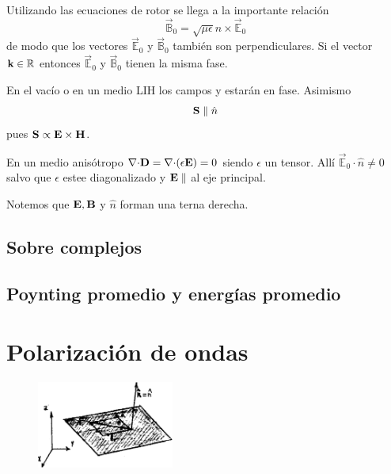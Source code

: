\documentclass[10pt,oneside]{CBFT_book}
\begin{document}
Utilizando las ecuaciones de rotor se llega a la importante relación 
\[
	\vec{\mathbb{B}}_0 = \sqrt{\mu\epsilon} \hat{n} \times \vec{\mathbb{E}}_0
\]
de modo que los vectores $\vec{\mathbb{E}}_0$ y $\vec{\mathbb{B}}_0$ también son perpendiculares.
Si el vector $\vb{k} \in \mathbb{R}$ entonces $\vec{\mathbb{E}}_0$ y $\vec{\mathbb{B}}_0$
tienen la misma fase.

En el vacío o en un medio LIH los campos  y  estarán en fase.
Asimismo
\[
	\vb{S} \parallel \hat{n}
\]
pues $\vb{S} \propto \pv{E}{H} $.

En un medio anisótropo $\divem{D}=\divem{}(\epsilon \vb{E}) = 0$ siendo $\epsilon$ un tensor.
Allí $\vec{\mathbb{E}}_0 \cdot \hat{n} \neq 0$ salvo que $\epsilon$ estee diagonalizado y
$\vb{E} \parallel$ al eje principal.

Notemos que $\vb{E},\vb{B}$ y $\hat{n}$ forman una terna derecha.

\subsection{Sobre complejos}



\subsection{Poynting promedio y energías promedio}


\section{Polarización de ondas}

\begin{figure}[htb]
	\begin{center}
	\includegraphics[width=0.4\textwidth]{images/fig_ft1_polariz.pdf}	 
	\end{center}
	\caption{}
\end{figure} 
\end{document}

